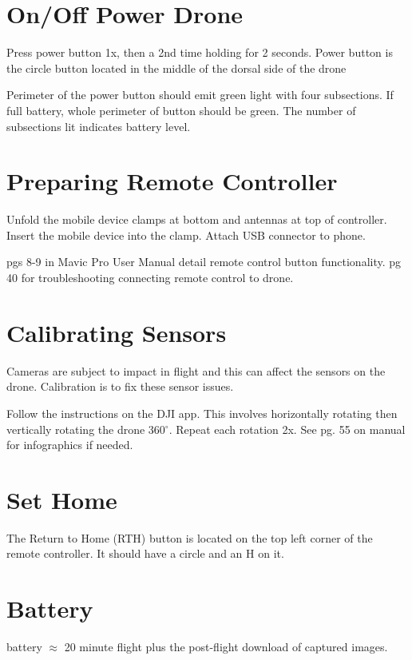 \documentclass[12pt]{../SOP4_alpha}\usepackage[]{graphicx}\usepackage[]{color}
\begin{document}
\section{On/Off Power Drone}

\NP Press power button 1x, then a 2nd time holding for 2 seconds. Power button is the circle button located in the middle of the dorsal side of the drone

\NP Perimeter of the power button should emit green light with four subsections. If full battery, whole perimeter of button should be green. The number of subsections lit indicates battery level.

\section{Preparing Remote Controller}

\NP Unfold the mobile device clamps at bottom and antennas at top of controller. Insert the mobile device into the clamp. 
Attach USB connector to phone. 

\NP pgs 8-9 in Mavic Pro User Manual detail remote control button functionality. pg 40 for troubleshooting connecting remote control to drone.

\section{Calibrating Sensors}

\NP Cameras are subject to impact in flight and this can affect the sensors on the drone. Calibration is to fix these sensor issues.

\NP Follow the instructions on the DJI app. This involves horizontally rotating then vertically rotating the drone 360$^{\circ}$. Repeat each rotation 2x. See pg. 55 on manual for infographics if needed.

\section{Set Home}

\NP The Return to Home (RTH) button is located on the top left corner of the remote controller. It should have a circle and an H on it. 

\section{Battery}

 battery $\approx$ 20 minute flight plus the post-flight download of captured images. 
\end{document}

